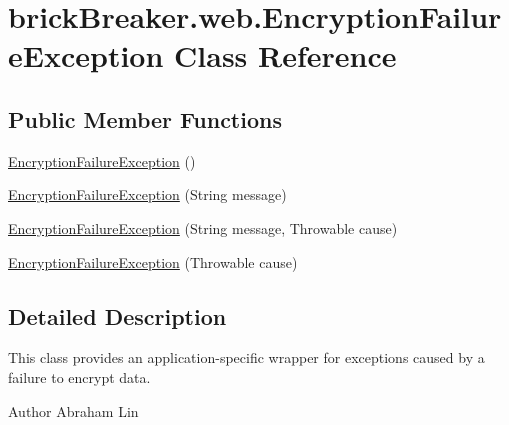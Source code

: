 \hypertarget{classbrick_breaker_1_1web_1_1_encryption_failure_exception}{
\section{brickBreaker.web.EncryptionFailureException Class Reference}
\label{classbrick_breaker_1_1web_1_1_encryption_failure_exception}
}
\subsection*{Public Member Functions}
\begin{DoxyCompactItemize}
\item 
\hyperlink{classbrick_breaker_1_1web_1_1_encryption_failure_exception_a9e4ffedf49a319ffa068ccc930cfd6cb}{EncryptionFailureException} ()
\item 
\hyperlink{classbrick_breaker_1_1web_1_1_encryption_failure_exception_aab8090ce69ecf671c7f99d75827e24b6}{EncryptionFailureException} (String message)
\item 
\hyperlink{classbrick_breaker_1_1web_1_1_encryption_failure_exception_ac5820d6e36448bfa6286d3fd4466bcaa}{EncryptionFailureException} (String message, Throwable cause)
\item 
\hyperlink{classbrick_breaker_1_1web_1_1_encryption_failure_exception_a0786930d051f36cb85a6d3d704b6cdfb}{EncryptionFailureException} (Throwable cause)
\end{DoxyCompactItemize}


\subsection{Detailed Description}
This class provides an application-\/specific wrapper for exceptions caused by a failure to encrypt data.

\begin{DoxyAuthor}{Author}
Abraham Lin 
\end{DoxyAuthor}



